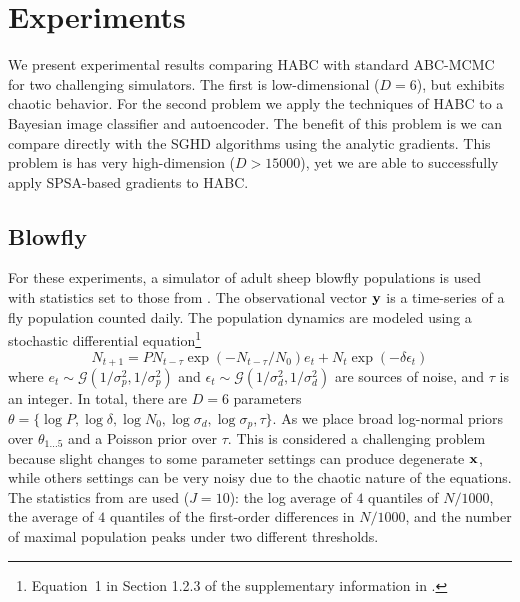 \documentclass[]{article}
\begin{document}

\section{Experiments}\label{sec:experiments}
We present experimental results comparing HABC with standard ABC-MCMC for two challenging simulators.  The first is low-dimensional ($D=6$), but exhibits chaotic behavior.  For the second problem we apply the techniques of HABC to a Bayesian image classifier and autoencoder.  The benefit of this problem is we can compare directly with the SGHD algorithms using the analytic gradients.  This problem is has very high-dimension ($D>15000$), yet we are able to successfully apply SPSA-based gradients to HABC. 


\subsection{Blowfly}\label{sec:bf}
For these experiments, a simulator of adult sheep blowfly populations \cite{wood2010statistical} is used with statistics set to those from \cite{Meeds2014GpsUai}.  The observational vector ${\bf y}$ is a time-series of a fly population counted daily. The population dynamics are modeled using a stochastic differential equation\footnote{Equation~1 in Section 1.2.3 of the supplementary information in \cite{wood2010statistical}.}
\begin{equation}
N_{t+1} = P N_{t-\tau} \exp(-N_{t-\tau}/N_0) e_t + N_t \exp(-\delta \epsilon_t) \nonumber
\end{equation}
where $e_t \sim  \mathcal{G}( 1/{\sigma_p^2},1/{\sigma_p^2})$ and $\epsilon_t 
 \sim  \mathcal{G}( 1/{\sigma_d^2},1/{\sigma_d^2})$  
are sources of noise, and $\tau$ is an integer.  In total, there are $D=6$ parameters $\theta = \{ \log P, \log \delta, \log N_0, \log \sigma_d, \log \sigma_p, \tau\}$.  As \cite{Meeds2014GpsUai} we place broad log-normal priors over $\theta_{1\ldots 5}$ and a Poisson prior over $\tau$.  This is considered a challenging problem because slight changes to some parameter settings can produce degenerate ${\bf x}$, while others settings can be very noisy due to the chaotic nature of the equations.  The statistics from \cite{Meeds2014GpsUai} are used ($J=10$): the log average of $4$ quantiles of $N/1000$, the average of $4$ quantiles of the first-order differences in $N/1000$, and the number of maximal population peaks under two different thresholds. 
\end{document}
